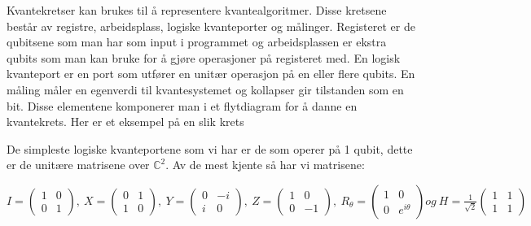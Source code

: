         Kvantekretser kan brukes til å representere kvantealgoritmer. Disse kretsene består av registre, arbeidsplass, logiske kvanteporter og målinger. Registeret er de qubitsene som man har som input i programmet og arbeidsplassen er ekstra qubits som man kan bruke for å gjøre operasjoner på registeret med. En logisk kvanteport er en port som utfører en unitær operasjon på en eller flere qubits. En måling måler en egenverdi til kvantesystemet og kollapser gir tilstanden som en bit. Disse elementene komponerer man i et flytdiagram for å danne en kvantekrets. Her er et eksempel på en slik krets

        De simpleste logiske kvanteportene som vi har er de som operer på 1 qubit, dette er de unitære matrisene over $\mathbb{C}^2$. Av de mest kjente så har vi matrisene:
        \begin{center}
            \begin{math}
                I = \begin{pmatrix}
                    1 & 0 \\ 0 & 1
                \end{pmatrix},\ X = \begin{pmatrix}
                    0 & 1 \\ 1 & 0
                \end{pmatrix},\ Y = \begin{pmatrix}
                    0 & -i \\ i & 0
                \end{pmatrix},\ Z = \begin{pmatrix}
                    1 & 0 \\ 0 & -1
                \end{pmatrix},\ R_\theta = \begin{pmatrix}
                    1 & 0 \\ 0 & e^{i\theta}
                \end{pmatrix} og\ H = \frac{1}{\sqrt{2}}\begin{pmatrix}
                    1 & 1 \\ 1 & 1
                \end{pmatrix}
            \end{math}
        \end{center}

